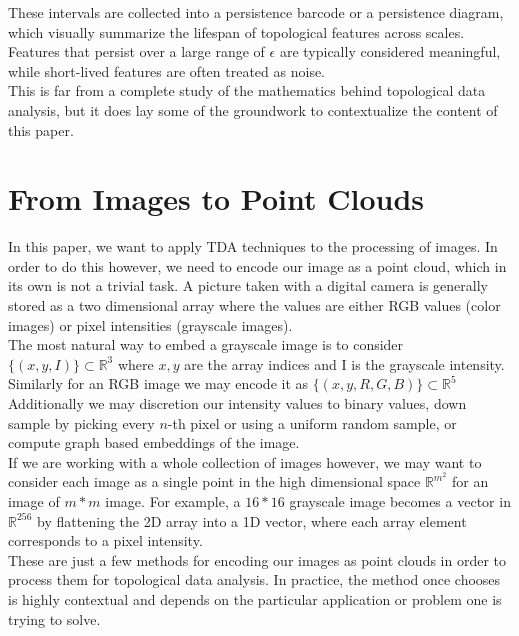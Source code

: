 \documentclass[12pt]{exam}
\begin{document}
These intervals are collected into a persistence barcode or a persistence diagram, which visually summarize the lifespan of topological features across scales. Features that persist over a large range of \( \epsilon \) are typically considered meaningful, while short-lived features are often treated as noise. \\

This is far from a complete study of the mathematics behind topological data analysis, but it does lay some of the groundwork to contextualize the content of this paper.

\section{From Images to Point Clouds}

In this paper, we want to apply TDA techniques to the processing of images. In order to do this however, we need to encode our image as a point cloud, which in its own is not a trivial task. A picture taken with a digital camera is generally stored as a two dimensional array where the values are either RGB values (color images) or pixel intensities (grayscale images).  \\

The most natural way to embed a grayscale image is to consider $\{(x, y, I)\} \subset \mathbb{R}^3$ where $x, y$ are the array indices and I is the grayscale intensity. Similarly for an RGB image we may encode it as $\{(x, y, R, G, B)\} \subset \mathbb{R}^5$ \\

Additionally we may discretion our intensity values to binary values, down sample by picking every $n$-th pixel or using a uniform random sample, or compute graph based embeddings of the image.  \\

If we are working with a whole collection of images however, we may want to consider each image as a single point in the high dimensional space $\mathbb{R}^{m^2}$ for an image of $m * m$ image. For example, a $16*16$ grayscale image becomes a vector in $\mathbb{R}^{256}$ by flattening the 2D array into a 1D vector, where each array element corresponds to a pixel intensity. \\

These are just a few methods for encoding our images as point clouds in order to process them for topological data analysis. In practice, the method once chooses is highly contextual and depends on the particular application or problem one is trying to solve.
\end{document}
